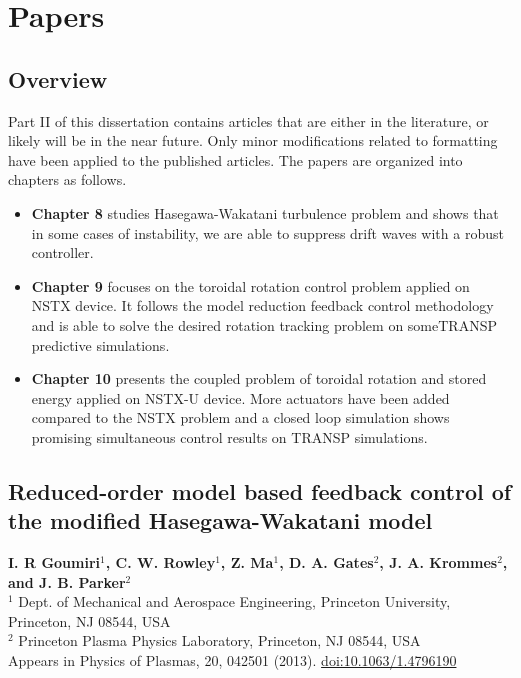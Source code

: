 \documentclass[12pt,lot, lof]{puthesis}
\begin{document}
\clearpage

\part{Papers}
\chapter{Overview}
Part II of this dissertation contains articles that are either in the literature, or likely will be in the near future. Only minor modifications related to formatting have been applied to the published articles. The papers are organized into chapters as follows.

\begin{itemize}
\item\textbf{Chapter 8} studies Hasegawa-Wakatani turbulence problem and shows that in some cases of instability, we are able to suppress drift waves with a robust controller.  
\item \textbf{Chapter 9} focuses on the toroidal rotation control problem applied on NSTX device. It follows the model reduction feedback control methodology and is able to solve the desired rotation tracking problem on someTRANSP predictive simulations.
\item \textbf{Chapter 10}  presents the coupled problem of toroidal rotation and stored energy applied on NSTX-U device. More actuators have been added compared to the NSTX problem and a closed loop simulation shows promising simultaneous control results on TRANSP simulations.
\end{itemize}

\chapter{Reduced-order model based feedback control of the modified Hasegawa-Wakatani model}
\label{chapter8}

\textbf{\large I. R Goumiri$^1$, C. W. Rowley$^1$, Z. Ma$^1$, D. A. Gates$^2$, J. A. Krommes$^2$, and J. B. Parker$^2$} \\
{\footnotesize $^1$ Dept. of Mechanical and Aerospace Engineering, Princeton University, Princeton, NJ 08544, USA \\[-0.4em]
$^2$ Princeton Plasma Physics Laboratory, Princeton, NJ 08544, USA} \\[1em]
%
{\footnotesize Appears in Physics of Plasmas, 20, 042501 (2013). \href{http://dx.doi.org/10.1063/1.4796190}{doi:10.1063/1.4796190}} \\[0.5em]
\end{document}
